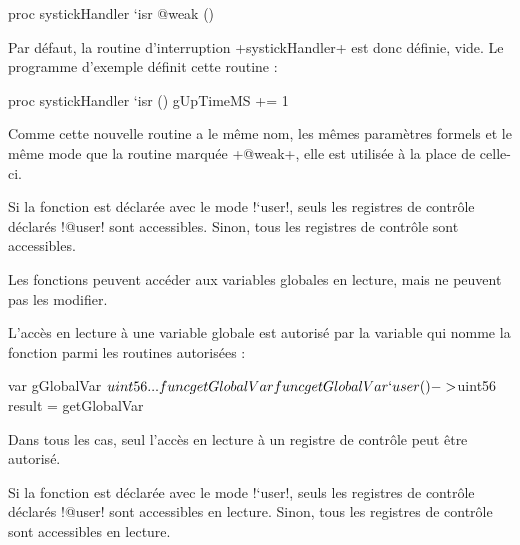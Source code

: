 \begin{PLM}
proc systickHandler `isr @weak () {
}
\end{PLM}

Par défaut, la routine d'interruption \plm+systickHandler+ est donc définie, vide. Le programme d'exemple définit cette routine :

\begin{PLM}
proc systickHandler `isr () {
  gUpTimeMS += 1
}
\end{PLM}

Comme cette nouvelle routine a le même nom, les mêmes paramètres formels et le même mode que la routine marquée \plm+@weak+, elle est utilisée à la place de celle-ci.






Si la fonction est déclarée avec le mode \plm!`user!, seuls les registres de contrôle déclarés \plm!@user! sont accessibles. Sinon, tous les registres de contrôle sont accessibles.



Les fonctions peuvent accéder aux variables globales en lecture, mais ne peuvent pas les modifier.

L'accès en lecture à une variable globale est autorisé par la variable qui nomme la fonction parmi les routines autorisées :

\begin{PLM}
var gGlobalVar $uint56 {
  ...
  func getGlobalVar
}

func getGlobalVar `user () -> $uint56 {
  result = getGlobalVar
}
\end{PLM}





Dans tous les cas, seul l'accès en lecture à un registre de contrôle peut être autorisé.


Si la fonction est déclarée avec le mode \plm!`user!, seuls les registres de contrôle déclarés \plm!@user! sont accessibles en lecture. Sinon, tous les registres de contrôle sont accessibles en lecture.



















